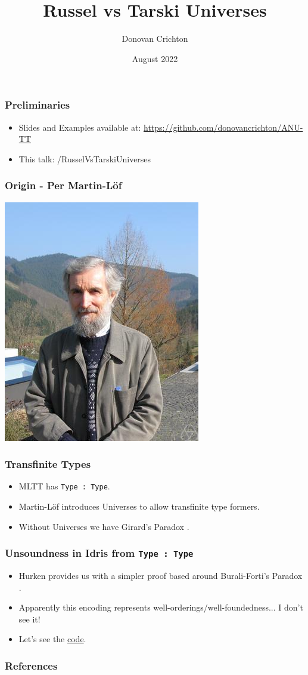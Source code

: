 \documentclass[hyperref={colorlinks = true,linkcolor = blue, citecolor = blue, urlcolor = blue}]{beamer}
\title{Russel vs Tarski Universes}
\author{Donovan Crichton}
\date{August 2022}
\begin{document}
 
\frame{\titlepage}

\begin{frame}[fragile]
  \frametitle{Preliminaries}
  \begin{itemize}
  \item Slides and Examples available at:
    \url{https://github.com/donovancrichton/ANU-TT}
  \item This talk: /RusselVsTarskiUniverses
  \end{itemize}
\end{frame}

\begin{frame}[fragile]
\frametitle{Origin - Per Martin-L{\"o}f}
\citep[p. 87-91]{martin1984intuitionistic}
\begin{center}
  \includegraphics[scale=0.5]{PerMartinLof}
\end{center}
\end{frame}

\begin{frame}[fragile]
\frametitle{Transfinite Types}
  \begin{itemize}
    \item MLTT has \texttt{Type : Type}.
    \item Martin-L{\"o}f introduces Universes to allow transfinite type formers.
    \item Without Universes we have Girard's Paradox \citet{girard1972interpretation}.
  \end{itemize}
\end{frame}

\begin{frame}[fragile]
  \frametitle{Unsoundness in Idris from \texttt{Type : Type}}
  \begin{itemize}
    \item Hurken provides us with a simpler proof based around Burali-Forti's
          Paradox \citet{hurkens1995simplification}. 
    \item Apparently this encoding represents well-orderings/well-foundedness...
          I don't see it!
    \item Let's see the \href{../Code/src/HurkensParadoxLoop.idr}{code}.
  \end{itemize}
\end{frame}

\begin{frame}[fragile]
\frametitle{References}
{}
\end{frame}
\end{document}
